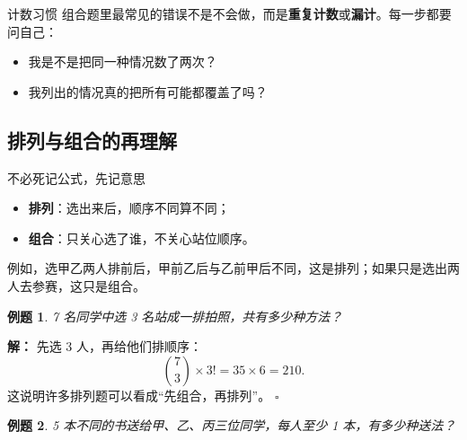 \documentclass[11pt,a4paper,fontset=fandol]{ctexart}
\theoremstyle{formaltheorem}
\theoremstyle{formalexample}
\newtheorem{example}{例题}[section]
\newenvironment{solution}{\par\noindent\textbf{解：}}{\hfill$\square$\par}
\begin{document}
\begin{skillbox}{计数习惯}
组合题里最常见的错误不是不会做，而是\textbf{重复计数}或\textbf{漏计}。每一步都要问自己：
\begin{itemize}
  \item 我是不是把同一种情况数了两次？
  \item 我列出的情况真的把所有可能都覆盖了吗？
\end{itemize}
\end{skillbox}

\subsection{排列与组合的再理解}

\begin{notebox}{不必死记公式，先记意思}
\begin{itemize}
  \item \textbf{排列}：选出来后，顺序不同算不同；
  \item \textbf{组合}：只关心选了谁，不关心站位顺序。
\end{itemize}
例如，选甲乙两人排前后，甲前乙后与乙前甲后不同，这是排列；如果只是选出两人去参赛，这只是组合。
\end{notebox}

\begin{example}
7 名同学中选 3 名站成一排拍照，共有多少种方法？
\end{example}

\begin{solution}
先选 3 人，再给他们排顺序：
\[
\binom{7}{3}\times 3!=35\times 6=210.
\]
这说明许多排列题可以看成“先组合，再排列”。
\end{solution}

\begin{example}
5 本不同的书送给甲、乙、丙三位同学，每人至少 1 本，有多少种送法？
\end{example}
\end{document}
